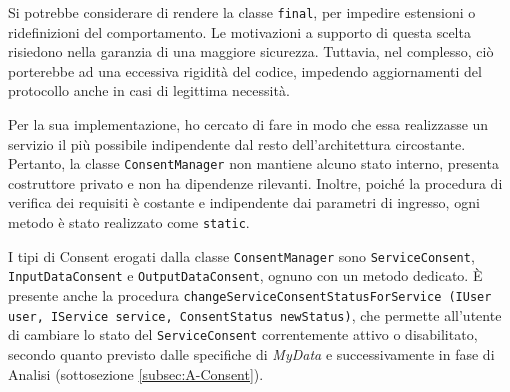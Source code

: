 Si potrebbe considerare di rendere la classe \texttt{final}, per impedire estensioni o ridefinizioni del comportamento. Le motivazioni a supporto di questa scelta risiedono nella garanzia di una maggiore sicurezza. Tuttavia, nel complesso, ci\`o porterebbe ad una eccessiva rigidit\`a del codice, impedendo aggiornamenti del protocollo anche in casi di legittima necessit\`a.

Per la sua implementazione, ho cercato di fare in modo che essa realizzasse un servizio il pi\`u possibile indipendente dal resto dell’architettura circostante. Pertanto, la classe \texttt{ConsentManager} non mantiene alcuno stato interno, presenta costruttore privato e non ha dipendenze rilevanti. Inoltre, poich\'e la procedura di verifica dei requisiti \`e costante e indipendente dai parametri di ingresso, ogni metodo \`e stato realizzato come \texttt{static}. 

I tipi di Consent erogati dalla classe \texttt{ConsentManager} sono \texttt{ServiceConsent}, \texttt{InputDataConsent} e \texttt{OutputDataConsent}, ognuno con un metodo dedicato. \`E presente anche la procedura \texttt{changeServiceConsentStatusForService (IUser user, IService service, ConsentStatus newStatus)}, che permette all’utente di cambiare lo stato del \texttt{ServiceConsent} correntemente attivo o disabilitato, secondo quanto previsto dalle specifiche di \textit{MyData} e successivamente in fase di Analisi (sottosezione \ref{subsec:A-Consent}).

